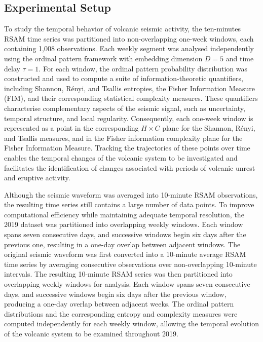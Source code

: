\documentclass[12pt,a4paper]{article}
\begin{document}
\subsection{Experimental Setup}
To study the temporal behavior of volcanic seismic activity, the ten-minutes RSAM time series was partitioned into non-overlapping one-week windows, each containing 1,008 observations. Each weekly segment was analysed independently using the ordinal pattern framework with embedding dimension $D=5$ and time delay $\tau=1$. For each window, the ordinal pattern probability distribution was constructed and used to compute a suite of information-theoretic quantifiers, including Shannon, R\'enyi, and Tsallis entropies, the Fisher Information Measure (FIM), and their corresponding statistical complexity measures. These quantifiers characterise complementary aspects of the seismic signal, such as uncertainty, temporal structure, and local regularity. Consequently, each one-week window is represented as a point in the corresponding $H \times C$ plane for the Shannon, R\'enyi, and Tsallis measures, and in the Fisher information complexity plane for the Fisher Information Measure. Tracking the trajectories of these points over time enables the temporal changes of the volcanic system to be investigated and facilitates the identification of changes associated with periods of volcanic unrest and eruptive activity.

Although the seismic waveform was averaged into 10-minute RSAM observations, the resulting time series still contains a large number of data points. To improve computational efficiency while maintaining adequate temporal resolution, the 2019 dataset was partitioned into overlapping weekly windows. Each window spans seven consecutive days, and successive windows begin six days after the previous one, resulting in a one-day overlap between adjacent windows. The original seismic waveform was first converted into a 10-minute average RSAM time series by averaging consecutive observations over non-overlapping 10-minute intervals. The resulting 10-minute RSAM series was then partitioned into overlapping weekly windows for analysis. Each window spans seven consecutive days, and successive windows begin six days after the previous window, producing a one-day overlap between adjacent weeks. The ordinal pattern distributions and the corresponding entropy and complexity measures were computed independently for each weekly window, allowing the temporal evolution of the volcanic system to be examined throughout 2019.
\end{document}
